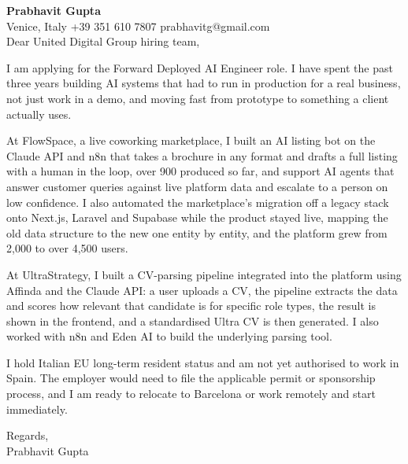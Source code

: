 \documentclass[a4paper,10.5pt]{article}
\begin{document}
\textbf{Prabhavit Gupta}\\
Venice, Italy \textbar{} +39 351 610 7807 \textbar{} prabhavitg@gmail.com\\[10pt]
Dear United Digital Group hiring team,

I am applying for the Forward Deployed AI Engineer role. I have spent the past three years building AI systems that had to run in production for a real business, not just work in a demo, and moving fast from prototype to something a client actually uses.

At FlowSpace, a live coworking marketplace, I built an AI listing bot on the Claude API and n8n that takes a brochure in any format and drafts a full listing with a human in the loop, over 900 produced so far, and support AI agents that answer customer queries against live platform data and escalate to a person on low confidence. I also automated the marketplace's migration off a legacy stack onto Next.js, Laravel and Supabase while the product stayed live, mapping the old data structure to the new one entity by entity, and the platform grew from 2,000 to over 4,500 users.

At UltraStrategy, I built a CV-parsing pipeline integrated into the platform using Affinda and the Claude API: a user uploads a CV, the pipeline extracts the data and scores how relevant that candidate is for specific role types, the result is shown in the frontend, and a standardised Ultra CV is then generated. I also worked with n8n and Eden AI to build the underlying parsing tool.

I hold Italian EU long-term resident status and am not yet authorised to work in Spain. The employer would need to file the applicable permit or sponsorship process, and I am ready to relocate to Barcelona or work remotely and start immediately.

Regards,\\
Prabhavit Gupta
\end{document}
